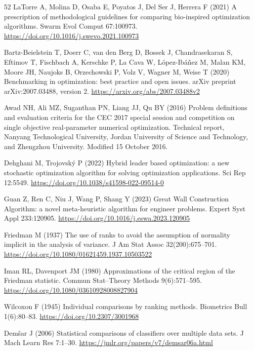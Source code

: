 \documentclass[pdflatex,onecolumn,sn-mathphys-num]{sn-jnl}
\begin{document}
\begin{thebibliography}{52}
LaTorre A, Molina D, Osaba E, Poyatos J, Del Ser J, Herrera F (2021) A prescription of methodological guidelines for comparing bio-inspired optimization algorithms. Swarm Evol Comput 67:100973. \url{https://doi.org/10.1016/j.swevo.2021.100973}

Bartz-Beielstein T, Doerr C, van den Berg D, Bossek J, Chandrasekaran S, Eftimov T, Fischbach A, Kerschke P, La Cava W, L\'{o}pez-Ib\'{a}\~{n}ez M, Malan KM, Moore JH, Naujoks B, Orzechowski P, Volz V, Wagner M, Weise T (2020) Benchmarking in optimization: best practice and open issues. arXiv preprint arXiv:2007.03488, version 2. \url{https://arxiv.org/abs/2007.03488v2}

Awad NH, Ali MZ, Suganthan PN, Liang JJ, Qu BY (2016) Problem definitions and evaluation criteria for the CEC 2017 special session and competition on single objective real-parameter numerical optimization. Technical report, Nanyang Technological University, Jordan University of Science and Technology, and Zhengzhou University. Modified 15 October 2016.

Dehghani M, Trojovsk\'{y} P (2022) Hybrid leader based optimization: a new stochastic optimization algorithm for solving optimization applications. Sci Rep 12:5549. \url{https://doi.org/10.1038/s41598-022-09514-0}

Guan Z, Ren C, Niu J, Wang P, Shang Y (2023) Great Wall Construction Algorithm: a novel meta-heuristic algorithm for engineer problems. Expert Syst Appl 233:120905. \url{https://doi.org/10.1016/j.eswa.2023.120905}

Friedman M (1937) The use of ranks to avoid the assumption of normality implicit in the analysis of variance. J Am Stat Assoc 32(200):675--701. \url{https://doi.org/10.1080/01621459.1937.10503522}

Iman RL, Davenport JM (1980) Approximations of the critical region of the Friedman statistic. Commun Stat--Theory Methods 9(6):571--595. \url{https://doi.org/10.1080/03610928008827904}

Wilcoxon F (1945) Individual comparisons by ranking methods. Biometrics Bull 1(6):80--83. \url{https://doi.org/10.2307/3001968}

Dem\v{s}ar J (2006) Statistical comparisons of classifiers over multiple data sets. J Mach Learn Res 7:1--30. \url{https://jmlr.org/papers/v7/demsar06a.html}


\end{thebibliography}
\end{document}
